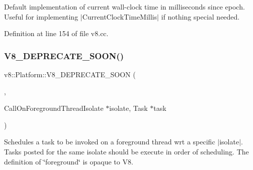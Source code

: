 Default implementation of current wall-\/clock time in milliseconds since epoch. Useful for implementing $\vert$\+Current\+Clock\+Time\+Millis$\vert$ if nothing special needed. 

Definition at line 154 of file v8.\+cc.

\mbox{\label{classv8_1_1Platform_a2a25af03a35d938b37f2378d25ad4c6e}} 
\subsubsection{\texorpdfstring{V8\+\_\+\+D\+E\+P\+R\+E\+C\+A\+T\+E\+\_\+\+S\+O\+O\+N()}{V8\_DEPRECATE\_SOON()}\hspace{0.1cm}{\footnotesize\ttfamily [1/3]}}
{\footnotesize\ttfamily v8\+::\+Platform\+::\+V8\+\_\+\+D\+E\+P\+R\+E\+C\+A\+T\+E\+\_\+\+S\+O\+ON (\begin{DoxyParamCaption}\item[{\char`\"{}Use a taskrunner acquired by \mbox{\hyperlink{classv8_1_1Platform_af0d18c6bbefa133c5d11ec8a460d0278}{Get\+Foreground\+Task\+Runner}} instead.\char`\"{}}]{,  }\item[{virtual void }]{Call\+On\+Foreground\+ThreadIsolate $\ast$isolate, Task $\ast$task }\end{DoxyParamCaption})\hspace{0.3cm}{\ttfamily [pure virtual]}}

Schedules a task to be invoked on a foreground thread wrt a specific $\vert$isolate$\vert$. Tasks posted for the same isolate should be execute in order of scheduling. The definition of \char`\"{}foreground\char`\"{} is opaque to V8. \mbox{\label{classv8_1_1Platform_a7bdd7f9f31ce5fe5c5f0fd8a0e597d04}} 
